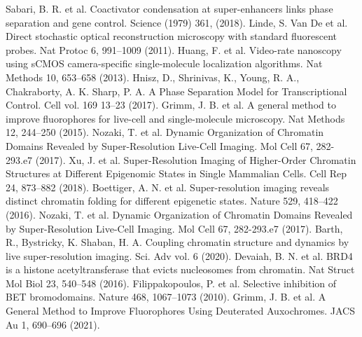 \documentclass{ucetd}
\begin{document}
\newline
\noindent [13] Sabari, B. R. et al. Coactivator condensation at super-enhancers links phase separation and gene control. Science (1979) 361, (2018). 
\newline
\noindent [14] Linde, S. Van De et al. Direct stochastic optical reconstruction microscopy with standard fluorescent probes. Nat Protoc 6, 991–1009 (2011). 
\newline
\noindent [15] Huang, F. et al. Video-rate nanoscopy using sCMOS camera-specific single-molecule localization algorithms. Nat Methods 10, 653–658 (2013). 
\newline
\noindent [16] Hnisz, D., Shrinivas, K., Young, R. A., Chakraborty, A. K. Sharp, P. A. A Phase Separation Model for Transcriptional Control. Cell vol. 169 13–23 (2017). 
\newline
\noindent [17] Grimm, J. B. et al. A general method to improve fluorophores for live-cell and single-molecule microscopy. Nat Methods 12, 244–250 (2015). 
\newline
\noindent [18] Nozaki, T. et al. Dynamic Organization of Chromatin Domains Revealed by Super-Resolution Live-Cell Imaging. Mol Cell 67, 282-293.e7 (2017). 
\newline
\noindent [19] Xu, J. et al. Super-Resolution Imaging of Higher-Order Chromatin Structures at Different Epigenomic States in Single Mammalian Cells. Cell Rep 24, 873–882 (2018). 
\newline
\noindent [20] Boettiger, A. N. et al. Super-resolution imaging reveals distinct chromatin folding for different epigenetic states. Nature 529, 418–422 (2016). 
\newline
\noindent [21] Nozaki, T. et al. Dynamic Organization of Chromatin Domains Revealed by Super-Resolution Live-Cell Imaging. Mol Cell 67, 282-293.e7 (2017). 
\noindent [3] Barth, R., Bystricky, K. Shaban, H. A. Coupling chromatin structure and dynamics by live super-resolution imaging. Sci. Adv vol. 6 (2020). 
\newline
\noindent [22] Devaiah, B. N. et al. BRD4 is a histone acetyltransferase that evicts nucleosomes from chromatin. Nat Struct Mol Biol 23, 540–548 (2016). 
\newline
\noindent [23] Filippakopoulos, P. et al. Selective inhibition of BET bromodomains. Nature 468, 1067–1073 (2010). 
\newline
\noindent [24] Grimm, J. B. et al. A General Method to Improve Fluorophores Using Deuterated Auxochromes. JACS Au 1, 690–696 (2021). 
\newline
\end{document}
